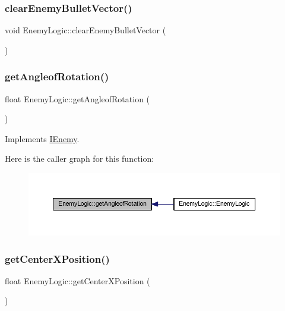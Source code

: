 \subsubsection{\texorpdfstring{clear\+Enemy\+Bullet\+Vector()}{clearEnemyBulletVector()}}
{\footnotesize\ttfamily void Enemy\+Logic\+::clear\+Enemy\+Bullet\+Vector (\begin{DoxyParamCaption}{ }\end{DoxyParamCaption})}

\mbox{\label{class_enemy_logic_ade03be41505c71de49f20fc855c8fede}} 
\subsubsection{\texorpdfstring{get\+Angleof\+Rotation()}{getAngleofRotation()}}
{\footnotesize\ttfamily float Enemy\+Logic\+::get\+Angleof\+Rotation (\begin{DoxyParamCaption}{ }\end{DoxyParamCaption})\hspace{0.3cm}{\ttfamily [virtual]}}



Implements \hyperlink{class_i_enemy_a8a9780d5db69d910f264fd7ab89ebee6}{I\+Enemy}.

Here is the caller graph for this function\+:
\nopagebreak
\begin{figure}[H]
\begin{center}
\leavevmode
\includegraphics[width=350pt]{class_enemy_logic_ade03be41505c71de49f20fc855c8fede_icgraph}
\end{center}
\end{figure}
\mbox{\label{class_enemy_logic_a1429e91a81da7646d9b0280f26519d8c}} 
\subsubsection{\texorpdfstring{get\+Center\+X\+Position()}{getCenterXPosition()}}
{\footnotesize\ttfamily float Enemy\+Logic\+::get\+Center\+X\+Position (\begin{DoxyParamCaption}{ }\end{DoxyParamCaption})\hspace{0.3cm}{\ttfamily [virtual]}}



